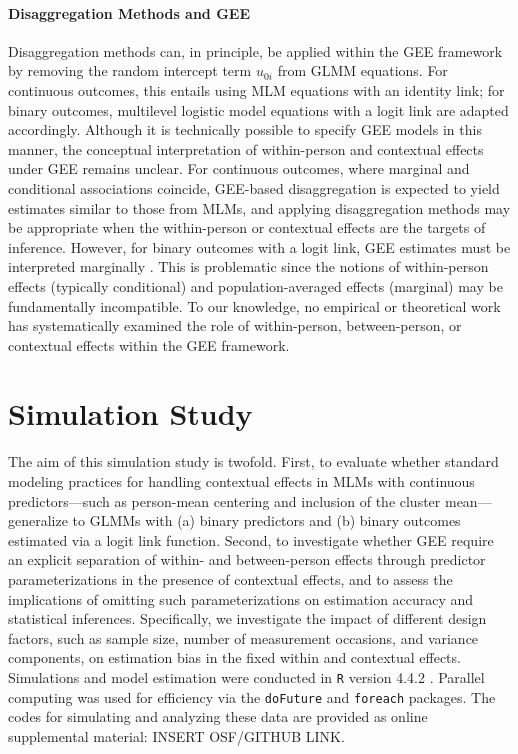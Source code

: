 \paragraph{Disaggregation Methods and GEE}

Disaggregation methods can, in principle, be applied within the GEE framework by removing the random intercept term \( u_{0i} \) from GLMM equations. For continuous outcomes, this entails using MLM equations with an identity link; for binary outcomes, multilevel logistic model equations with a logit link are adapted accordingly. Although it is technically possible to specify GEE models in this manner, the conceptual interpretation of within-person and contextual effects under GEE remains unclear. For continuous outcomes, where marginal and conditional associations coincide, GEE-based disaggregation is expected to yield estimates similar to those from MLMs, and applying disaggregation methods may be appropriate when the within-person or contextual effects are the targets of inference. However, for binary outcomes with a logit link, GEE estimates must be interpreted marginally \parencite{neuhaus_comparison_1991}. This is problematic since the notions of within-person effects (typically conditional) and population-averaged effects (marginal) may be fundamentally incompatible. To our knowledge, no empirical or theoretical work has systematically examined the role of within-person, between-person, or contextual effects within the GEE framework.

\section{Simulation Study}

The aim of this simulation study is twofold. First, to evaluate whether standard modeling practices for handling contextual effects in MLMs with continuous predictors—such as person-mean centering and inclusion of the cluster mean—generalize to GLMMs with (a) binary predictors and (b) binary outcomes estimated via a logit link function. Second, to investigate whether GEE require an explicit separation of within- and between-person effects through predictor parameterizations in the presence of contextual effects, and to assess the implications of omitting such parameterizations on estimation accuracy and statistical inferences. Specifically, we investigate the impact of different design factors, such as sample size, number of measurement occasions, and variance components, on estimation bias in the fixed within and contextual effects. Simulations and model estimation were conducted in \texttt{R} version 4.4.2 \parencite{r_core_team_r_2024}. Parallel computing was used for efficiency via the \texttt{doFuture} \parencite{RJ-2021-048} and \texttt{foreach} \parencite{daniel_foreach_2022} packages. The codes for simulating and analyzing these data are provided as online supplemental material: INSERT OSF/GITHUB LINK.

